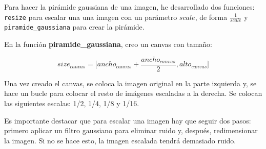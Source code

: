 \documentclass[11pt,a4paper]{article}
\theoremstyle{plain}
\theoremstyle{definition}
\begin{document}
Para hacer la pirámide gaussiana de una imagen, he desarrollado dos funciones: \texttt{resize} para escalar una una imagen con un parámetro $scale$, de forma $\frac{1}{scale}$ y \texttt{piramide\_gaussiana} para crear la pirámide.

En la función \textbf{piramide\_gaussiana}, creo un canvas con tamaño:

\begin{displaymath}
size_{canvas} = \bigg [ ancho_{canvas} + \frac{ancho_{canvas}}{2}, alto_{canvas} \bigg ]
\end{displaymath}

Una vez creado el canvas, se coloca la imagen original en la parte izquierda y, se hace un bucle para colocar el resto de imágenes escaladas a la derecha. Se colocan las siguientes escalas: 1/2, 1/4, 1/8 y 1/16.

Es importante destacar que para escalar una imagen hay que seguir dos pasos: primero aplicar un filtro gaussiano para eliminar ruido y, después, redimensionar la imagen. Si no se hace esto, la imagen escalada tendrá demasiado ruido.
\end{document}
